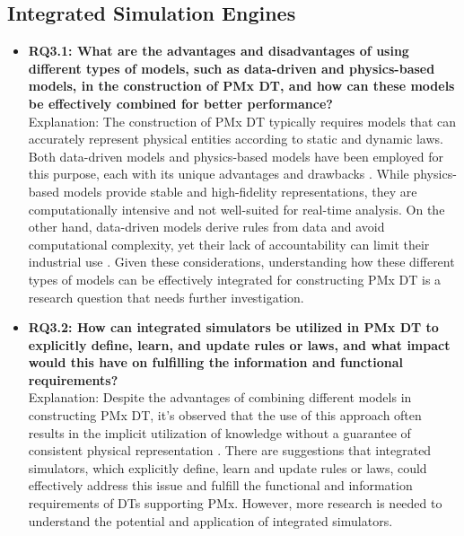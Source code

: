 \documentclass[runningheads]{llncs}
\begin{document}
\subsection{Integrated Simulation Engines}
\begin{itemize}
\item \textbf{RQ3.1: What are the advantages and disadvantages of using different types of models, such as data-driven and physics-based models, in the construction of PMx DT, and how can these models be effectively combined for better performance?} \\
Explanation: The construction of PMx DT typically requires models that can accurately represent physical entities according to static and dynamic laws. Both data-driven models and physics-based models have been employed for this purpose, each with its unique advantages and drawbacks \cite{coraddu2019data, ritto2021digital}. While physics-based models provide stable and high-fidelity representations, they are computationally intensive and not well-suited for real-time analysis. On the other hand, data-driven models derive rules from data and avoid computational complexity, yet their lack of accountability can limit their industrial use \cite{gilpin2018explaining}. Given these considerations, understanding how these different types of models can be effectively integrated for constructing PMx DT is a research question that needs further investigation.
\item \textbf{RQ3.2: How can integrated simulators be utilized in PMx DT to explicitly define, learn, and update rules or laws, and what impact would this have on fulfilling the information and functional requirements?} \\
Explanation: Despite the advantages of combining different models in constructing PMx DT, it's observed that the use of this approach often results in the implicit utilization of knowledge without a guarantee of consistent physical representation \cite{gong2022data}. There are suggestions that integrated simulators, which explicitly define, learn and update rules or laws, could effectively address this issue and fulfill the functional and information requirements of DTs supporting PMx. However, more research is needed to understand the potential and application of integrated simulators.
\end{itemize}
\end{document}
